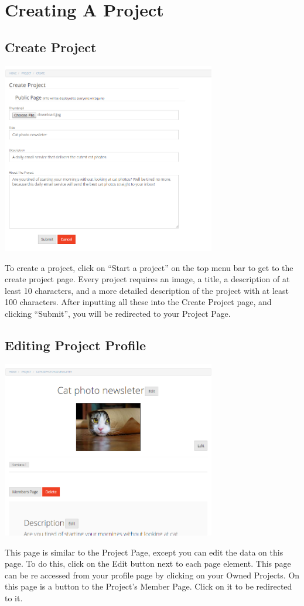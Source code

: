 \documentclass[11pt]{report}
\begin{document}
\section{Creating A Project}
\subsection{Create Project}
	\begin{center}
           \includegraphics[width=0.7\textwidth]{userguide/createproject}
    \end{center}
    To create a project, click on “Start a project” on the top menu bar to get to the create project page. Every project requires an image, a title, a description of at least 10 characters, and a more detailed description of the project with at least 100 characters. After inputting all these into the Create Project page, and clicking “Submit”, you will be redirected to your Project Page. 

\subsection{Editing Project Profile}
	\begin{center}
           \includegraphics[width=0.7\textwidth]{userguide/editprojectpage}
    \end{center}
    This page is similar to the Project Page, except you can edit the data on this page. To do this, click on the Edit button next to each page element. This page can be re accessed from your profile page by clicking on your Owned Projects. On this page is a button to the Project's Member Page. Click on it to be redirected to it.
\end{document}
